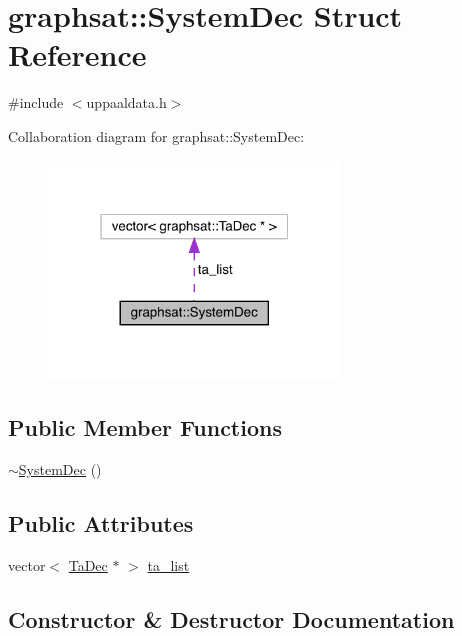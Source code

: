 \hypertarget{structgraphsat_1_1_system_dec}{}\section{graphsat\+::System\+Dec Struct Reference}
\label{structgraphsat_1_1_system_dec}


{\ttfamily \#include $<$uppaaldata.\+h$>$}



Collaboration diagram for graphsat\+::System\+Dec\+:
\nopagebreak
\begin{figure}[H]
\begin{center}
\leavevmode
\includegraphics[width=220pt]{structgraphsat_1_1_system_dec__coll__graph}
\end{center}
\end{figure}
\subsection*{Public Member Functions}
\begin{DoxyCompactItemize}
\item 
\mbox{\hyperlink{structgraphsat_1_1_system_dec_ab3601fdfb0cd5e70d2584e10b7f81958}{$\sim$\+System\+Dec}} ()
\end{DoxyCompactItemize}
\subsection*{Public Attributes}
\begin{DoxyCompactItemize}
\item 
vector$<$ \mbox{\hyperlink{structgraphsat_1_1_ta_dec}{Ta\+Dec}} $\ast$ $>$ \mbox{\hyperlink{structgraphsat_1_1_system_dec_a5623ebdca148d6573e9567b04d42102b}{ta\+\_\+list}}
\end{DoxyCompactItemize}


\subsection{Constructor \& Destructor Documentation}
\mbox{\label{structgraphsat_1_1_system_dec_ab3601fdfb0cd5e70d2584e10b7f81958}} 
